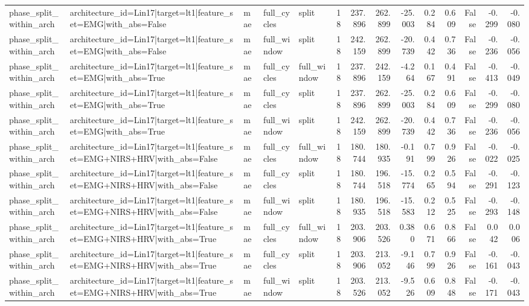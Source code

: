 \begin{table}
\begin{tabular}{lllllrrrrrrrrr}
phase_split_within_arch & architecture_id=Lin17|target=lt1|feature_set=EMG|with_abs=False & mae & full_cycles & split & 18 & 237.896 & 262.899 & -25.003 & 0.284 & 0.609 & False & -0.299 & -0.080 \\
phase_split_within_arch & architecture_id=Lin17|target=lt1|feature_set=EMG|with_abs=False & mae & full_window & split & 18 & 242.159 & 262.899 & -20.739 & 0.442 & 0.736 & False & -0.236 & -0.056 \\
phase_split_within_arch & architecture_id=Lin17|target=lt1|feature_set=EMG|with_abs=True & mae & full_cycles & full_window & 18 & 237.896 & 242.159 & -4.264 & 0.167 & 0.491 & False & -0.413 & -0.049 \\
phase_split_within_arch & architecture_id=Lin17|target=lt1|feature_set=EMG|with_abs=True & mae & full_cycles & split & 18 & 237.896 & 262.899 & -25.003 & 0.284 & 0.609 & False & -0.299 & -0.080 \\
phase_split_within_arch & architecture_id=Lin17|target=lt1|feature_set=EMG|with_abs=True & mae & full_window & split & 18 & 242.159 & 262.899 & -20.739 & 0.442 & 0.736 & False & -0.236 & -0.056 \\
phase_split_within_arch & architecture_id=Lin17|target=lt1|feature_set=EMG+NIRS+HRV|with_abs=False & mae & full_cycles & full_window & 18 & 180.744 & 180.935 & -0.191 & 0.799 & 0.926 & False & -0.022 & -0.025 \\
phase_split_within_arch & architecture_id=Lin17|target=lt1|feature_set=EMG+NIRS+HRV|with_abs=False & mae & full_cycles & split & 18 & 180.744 & 196.518 & -15.774 & 0.265 & 0.594 & False & -0.291 & -0.123 \\
phase_split_within_arch & architecture_id=Lin17|target=lt1|feature_set=EMG+NIRS+HRV|with_abs=False & mae & full_window & split & 18 & 180.935 & 196.518 & -15.583 & 0.212 & 0.525 & False & -0.293 & -0.148 \\
phase_split_within_arch & architecture_id=Lin17|target=lt1|feature_set=EMG+NIRS+HRV|with_abs=True & mae & full_cycles & full_window & 18 & 203.906 & 203.526 & 0.380 & 0.671 & 0.866 & False & 0.042 & 0.006 \\
phase_split_within_arch & architecture_id=Lin17|target=lt1|feature_set=EMG+NIRS+HRV|with_abs=True & mae & full_cycles & split & 18 & 203.906 & 213.052 & -9.146 & 0.799 & 0.926 & False & -0.161 & -0.043 \\
phase_split_within_arch & architecture_id=Lin17|target=lt1|feature_set=EMG+NIRS+HRV|with_abs=True & mae & full_window & split & 18 & 203.526 & 213.052 & -9.526 & 0.609 & 0.848 & False & -0.171 & -0.043 \\

\end{tabular}
\end{table}
